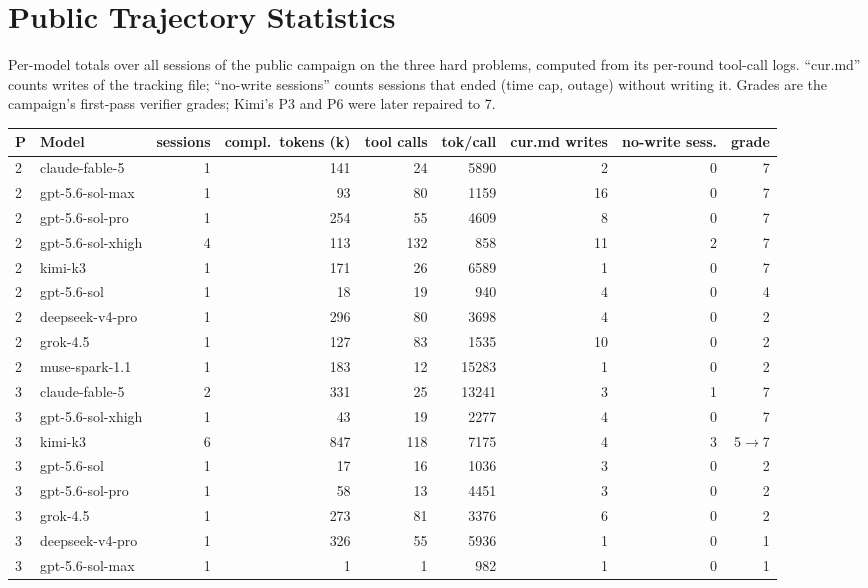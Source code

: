 \section{Public Trajectory Statistics}
\label{app:traj}
Per-model totals over all sessions of the public campaign \citep{deedy2026imo} on the three hard problems, computed from its per-round tool-call logs. ``cur.md'' counts writes of the tracking file; ``no-write sessions'' counts sessions that ended (time cap, outage) without writing it. Grades are the campaign's first-pass verifier grades; Kimi's P3 and P6 were later repaired to 7.

\begin{table}[htbp]
  \centering\scriptsize
  \begin{tabular}{@{}llrrrrrrr@{}}
    \toprule
    P & Model & sessions & compl.\ tokens (k) & tool calls & tok/call & cur.md writes & no-write sess. & grade \\
    \midrule
    2 & claude-fable-5 & 1 & 141 & 24 & 5890 & 2 & 0 & 7 \\
    2 & gpt-5.6-sol-max & 1 & 93 & 80 & 1159 & 16 & 0 & 7 \\
    2 & gpt-5.6-sol-pro & 1 & 254 & 55 & 4609 & 8 & 0 & 7 \\
    2 & gpt-5.6-sol-xhigh & 4 & 113 & 132 & 858 & 11 & 2 & 7 \\
    2 & kimi-k3 & 1 & 171 & 26 & 6589 & 1 & 0 & 7 \\
    2 & gpt-5.6-sol & 1 & 18 & 19 & 940 & 4 & 0 & 4 \\
    2 & deepseek-v4-pro & 1 & 296 & 80 & 3698 & 4 & 0 & 2 \\
    2 & grok-4.5 & 1 & 127 & 83 & 1535 & 10 & 0 & 2 \\
    2 & muse-spark-1.1 & 1 & 183 & 12 & 15283 & 1 & 0 & 2 \\
    3 & claude-fable-5 & 2 & 331 & 25 & 13241 & 3 & 1 & 7 \\
    3 & gpt-5.6-sol-xhigh & 1 & 43 & 19 & 2277 & 4 & 0 & 7 \\
    3 & kimi-k3 & 6 & 847 & 118 & 7175 & 4 & 3 & 5$\to$7 \\
    3 & gpt-5.6-sol & 1 & 17 & 16 & 1036 & 3 & 0 & 2 \\
    3 & gpt-5.6-sol-pro & 1 & 58 & 13 & 4451 & 3 & 0 & 2 \\
    3 & grok-4.5 & 1 & 273 & 81 & 3376 & 6 & 0 & 2 \\
    3 & deepseek-v4-pro & 1 & 326 & 55 & 5936 & 1 & 0 & 1 \\
    3 & gpt-5.6-sol-max & 1 & 1 & 1 & 982 & 1 & 0 & 1 \\

\end{tabular}
\end{table}
